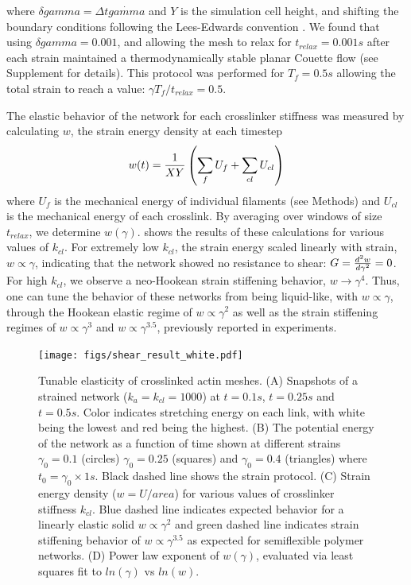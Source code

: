 \documentclass[12pt]{article}
\begin{document}
where $\delta gamma=\Delta t \dot{gamma}$ and $Y$ is the simulation cell height,
and shifting the boundary conditions following the Lees-Edwards convention 
\cite{allen}. We found that using $\delta gamma=0.001$, and allowing the mesh
to relax for $t_{relax} =0.001 s$ after each strain
maintained a thermodynamically stable planar Couette flow (see Supplement for 
details). This protocol was performed for $T_f=0.5s$ allowing the total strain 
to reach a value: $\gamma T_f/t_{relax}=0.5$. 
\par
The elastic behavior of the network for each crosslinker stiffness was measured
by calculating $w$, the strain energy density at each timestep
\begin{equation}
  w(t) = {1\over X Y}\left(\sum_f{ U_f}+\sum_{cl}{U_{cl}}\right)
  \label{eqn:sed}
\end{equation}
where $U_f$ is the mechanical energy of individual filaments (see Methods) and 
$U_{cl}$ is the mechanical energy of each crosslink. By averaging
over windows of size $t_{relax}$, we determine $w(\gamma)$.  
shows the results of these calculations for various values of $k_{cl}$. 
For extremely low $k_{cl}$, the strain energy
scaled linearly with strain, $w\propto \gamma$, indicating that the network 
showed no resistance to shear: $G={d^2w\over d\gamma^2}=0$. For high $k_{cl}$, 
we observe a neo-Hookean strain stiffening behavior, $w\rightarrow\gamma^4$\cite{shokef2012}. 
Thus, one can tune the behavior of these networks from being liquid-like, 
with $w\propto\gamma$, through the Hookean elastic regime of $w\propto\gamma^2$ 
as well as the strain stiffening regimes of $w\propto\gamma^3$ and
$w\propto\gamma^{3.5}$, previously reported in experiments\cite{gardel2004, kasza2009}. 
\begin{figure}[H]
  \centering
  \texttt{[image: figs/shear\_result\_white.pdf]}
  \caption{%
    \label{fig:stress}%
    Tunable elasticity of crosslinked actin meshes. 
    (A) Snapshots of a strained network ($k_a=k_{cl}=1000$) at $t=0.1s$, 
    $t=0.25s$ and $t=0.5s$. Color indicates stretching energy on each link, with
    white being the lowest and red being the highest. 
    (B) The potential energy of the network as a function of time shown at
    different strains $\gamma_0=0.1$ (circles) $\gamma_0=0.25$ (squares) and
    $\gamma_0=0.4$ (triangles) where $t_0=\gamma_0\times 1s$. Black dashed line
    shows the strain protocol.   
    (C) Strain energy density ($w=U/area$) for various values of crosslinker
    stiffness $k_{cl}$. Blue dashed line indicates expected behavior for a 
    linearly elastic solid $w\propto \gamma^2$ and green dashed line indicates
    strain stiffening behavior of $w\propto \gamma^{3.5}$ as expected 
    for semiflexible polymer networks\cite{gardel2004,lin2010}.
   (D) Power law exponent of $w(\gamma)$, evaluated via least squares fit to
   $ln(\gamma)$ vs $ln(w)$. 
  }
\end{figure}
\end{document}
